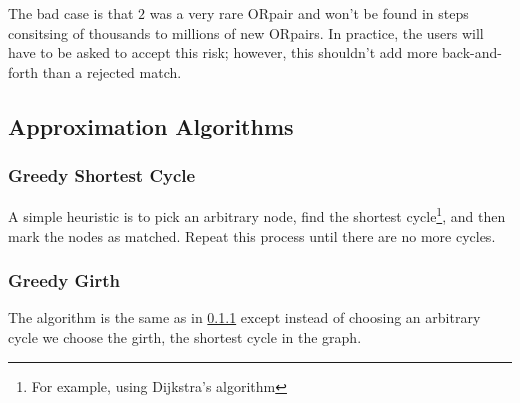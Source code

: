 \documentclass[main.tex]{subfiles}
\begin{document}
The bad case is that $2$ was a very rare ORpair and won't be found in steps consitsing of thousands to millions of new ORpairs. In practice, the users will have to be asked to accept this risk; however, this shouldn't add more back-and-forth than a rejected match.


\subsection{Approximation Algorithms}

\subsubsection{Greedy Shortest Cycle}\label{sec:gsc}
A simple heuristic is to pick an arbitrary node, find the shortest cycle\footnote{For example, using Dijkstra's algorithm}, and then mark the nodes as matched. Repeat this process until there are no more cycles.

\subsubsection{Greedy Girth}
The algorithm is the same as in \ref{sec:gsc} except instead of choosing an arbitrary cycle we choose the girth, the shortest cycle in the graph.
\end{document}
